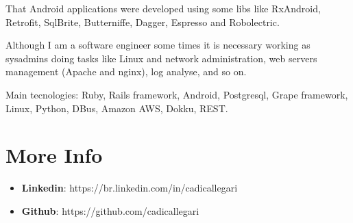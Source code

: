 \documentclass[margin]{res}
\begin{document}
\begin{resume}
That Android applications were developed using some libs like RxAndroid, Retrofit, SqlBrite, Butterniffe, Dagger, Espresso and Robolectric.

Although I am a software engineer some times it is necessary working as sysadmins doing tasks like Linux and network administration, web servers management (Apache and nginx), log analyse, and so on.

Main tecnologies: Ruby, Rails framework, Android, Postgresql, Grape framework, Linux, Python, DBus, Amazon AWS, Dokku, REST.


\section{More Info}
    \begin{itemize}
        \item \textbf{Linkedin}: https://br.linkedin.com/in/cadicallegari
         \item \textbf{Github}: https://github.com/cadicallegari
    \end{itemize}


\end{resume}
\end{document}
